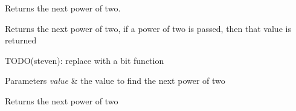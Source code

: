 Returns the next power of two. 

Returns the next power of two, if a power of two is passed, then that value is returned

T\+O\+D\+O(steven)\+: replace with a bit function


\begin{DoxyParams}{Parameters}
{\em value} & the value to find the next power of two \\
\hline
\end{DoxyParams}
\begin{DoxyReturn}{Returns}
the next power of two 
\end{DoxyReturn}

